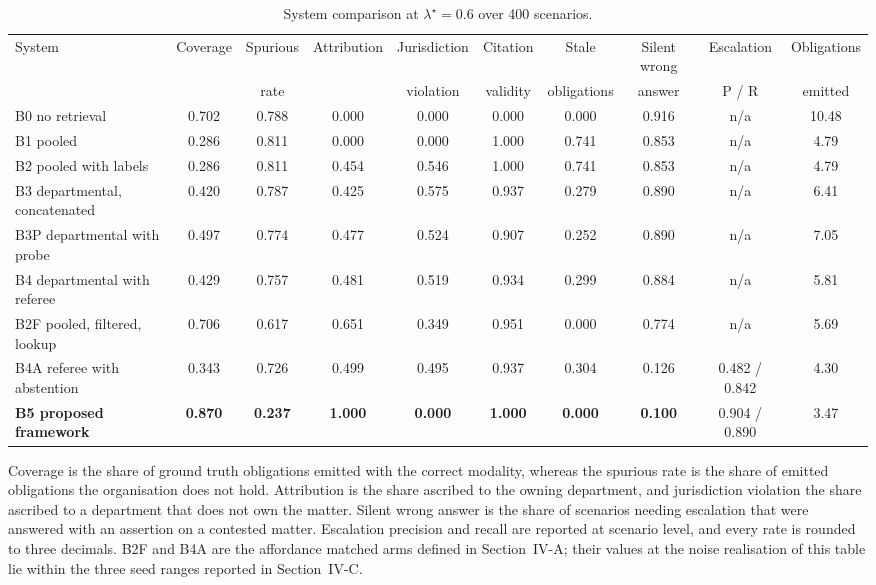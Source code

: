 \documentclass[journal]{IEEEtran}
\begin{document}
\begin{table}[!t]
\centering
\caption{System comparison at $\lambda^\star=0.6$ over 400 scenarios.}
\label{tab:systems}
\footnotesize
\setlength{\tabcolsep}{3.5pt}
\begin{tabular}{@{}lccccccccc@{}}
\toprule
System & Coverage & Spurious & Attribution & Jurisdiction & Citation & Stale & Silent wrong & Escalation & Obligations \\
 & & rate & & violation & validity & obligations & answer & P / R & emitted \\
\midrule
B0 no retrieval                & 0.702 & 0.788 & 0.000 & 0.000 & 0.000 & 0.000 & 0.916 & n/a & 10.48 \\
B1 pooled                      & 0.286 & 0.811 & 0.000 & 0.000 & 1.000 & 0.741 & 0.853 & n/a & 4.79 \\
B2 pooled with labels          & 0.286 & 0.811 & 0.454 & 0.546 & 1.000 & 0.741 & 0.853 & n/a & 4.79 \\
B3 departmental, concatenated  & 0.420 & 0.787 & 0.425 & 0.575 & 0.937 & 0.279 & 0.890 & n/a & 6.41 \\
B3P departmental with probe    & 0.497 & 0.774 & 0.477 & 0.524 & 0.907 & 0.252 & 0.890 & n/a & 7.05 \\
B4 departmental with referee   & 0.429 & 0.757 & 0.481 & 0.519 & 0.934 & 0.299 & 0.884 & n/a & 5.81 \\
\midrule
B2F pooled, filtered, lookup   & 0.706 & 0.617 & 0.651 & 0.349 & 0.951 & 0.000 & 0.774 & n/a & 5.69 \\
B4A referee with abstention    & 0.343 & 0.726 & 0.499 & 0.495 & 0.937 & 0.304 & 0.126 & 0.482 / 0.842 & 4.30 \\
\midrule
\textbf{B5 proposed framework} & \textbf{0.870} & \textbf{0.237} & \textbf{1.000} & \textbf{0.000} & \textbf{1.000} & \textbf{0.000} & \textbf{0.100} & 0.904 / 0.890 & 3.47 \\
\bottomrule
\end{tabular}

\vspace{2pt}
\footnotesize\raggedright
Coverage is the share of ground truth obligations emitted with the correct modality, whereas the spurious rate is the share of emitted obligations the organisation does not hold. Attribution is the share ascribed to the owning department, and jurisdiction violation the share ascribed to a department that does not own the matter. Silent wrong answer is the share of scenarios needing escalation that were answered with an assertion on a contested matter. Escalation precision and recall are reported at scenario level, and every rate is rounded to three decimals. B2F and B4A are the affordance matched arms defined in Section~IV-A; their values at the noise realisation of this table lie within the three seed ranges reported in Section~IV-C.
\end{table}
\end{document}
